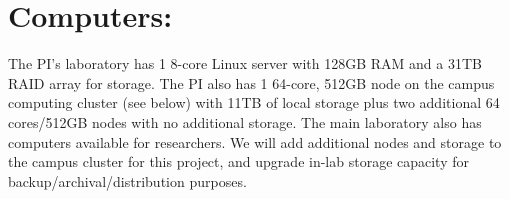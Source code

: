 \section*{Computers:} The PI’s laboratory has 1 8-core Linux server with 128GB RAM and a 31TB RAID array for storage.  The PI also has 1 64-core, 512GB node on the campus computing cluster (see below) with 11TB of local storage plus two additional 64 cores/512GB nodes with no additional storage.  The main laboratory also has computers available for researchers.  We will add additional nodes and storage to the campus cluster for this project, and upgrade in-lab storage capacity for backup/archival/distribution purposes.  